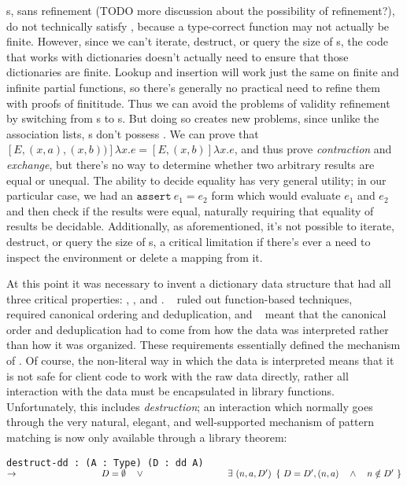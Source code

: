 {{\FPF}s, sans refinement (TODO more discussion about the possibility of refinement?), do not technically
satisfy \SemTot, because a type-correct function may not
actually be finite. However, since we can't iterate, destruct, or query the size of {\FPF}s, the code
that works with dictionaries doesn't actually need to ensure that those dictionaries are finite. Lookup
and insertion will work just the same on finite and infinite partial functions, so there's generally no
practical need to refine them with proofs of finititude. Thus we can avoid the problems of validity refinement
by switching from {\CAL}s to {\FPF}s. But doing so creates new problems, since unlike the association lists,
{\FPF}s don't possess \EqDec. We can prove that
\mbox{$[E, (x, a), (x, b))]\lambda x . e = [E, (x, b)]\lambda x . e$}, and thus prove \emph{contraction} and
\emph{exchange}, but there's no way to determine whether two arbitrary results are equal or unequal.
The ability to decide equality has very general utility; in our particular case, we had an
\mbox{$\texttt{assert}~ e_1 = e_2$} form which would evaluate $e_1$ and $e_2$ and then check if the results
were equal, naturally requiring that equality of results be decidable. Additionally, as aforementioned,
it's not possible to iterate, destruct, or query the size of {\FPF}s, a critical limitation if there's
ever a need to inspect the environment or delete a mapping from it.

At this point it was necessary to invent a dictionary data structure that had all three critical properties:
\SemTot, \SemInj, and \EqDec. \EqDec~ ruled out function-based techniques, \SemInj~ required canonical
ordering and deduplication, and \SemTot~ meant that the canonical order and deduplication had to come from
how the data was interpreted rather than how it was organized. These requirements essentially defined the
mechanism of \dds. Of course, the non-literal way in which the data is interpreted means that it is not
safe for client code to work with the raw data directly, rather all interaction with the data must be
encapsulated in library functions. Unfortunately, this includes \emph{destruction}; an interaction which
normally goes through the very natural, elegant, and well-supported mechanism of pattern matching is now
only available through a library theorem:

\texttt{destruct-dd : (A : Type) (D : dd A) $\rightarrow \\
\phantom{xxxxxxxxxxxxxxxx} D = \emptyset \quad \lor \\
\phantom{xxxxxxxxxxxxxxxx} \exists~(n, a, D')~\left\{~ D = D' , (n, a) \quad \land \quad n \notin D' ~\right\}$}

}
